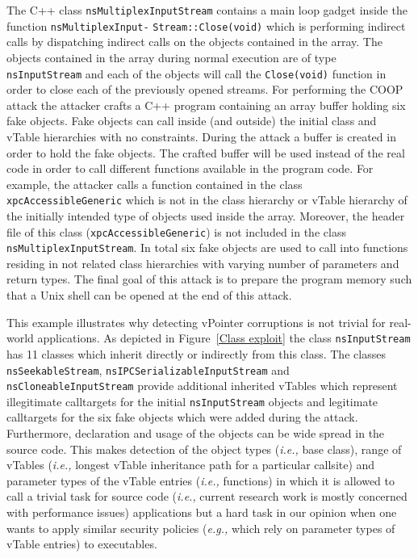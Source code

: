The C++ class \texttt{nsMultiplexInputStream} contains a main loop gadget inside the function 
\texttt{nsMultiplexInput-} \texttt{Stream::Close(void)} which is performing indirect calls by dispatching
indirect calls on the objects contained in the array. 
The objects contained in the array during normal execution are of type \texttt{nsInputStream} and each
of the objects will call the \texttt{Close(void)} function in order to close each of the previously opened streams.
For performing the COOP attack the attacker crafts a C++ program containing an array buffer holding 
six fake objects. Fake objects can call inside (and outside) the initial class and vTable hierarchies
with no constraints.
During the attack a buffer is created in order to hold the fake objects.
The crafted buffer will be used instead of the real code in order to call different functions
available in the program code. For example, the attacker calls a function contained in the class
\texttt{xpcAccessibleGeneric} which is not in the class hierarchy or vTable hierarchy
of the initially intended type of objects used inside the array.
Moreover, the header file of this class (\texttt{xpcAccessibleGeneric}) is not included in the 
class \texttt{nsMultiplexInputStream}.
In total six fake objects are used to call into functions residing in not related class hierarchies with varying 
number of parameters and return types. The final goal of this attack is to prepare the program memory such 
that a Unix shell can be opened at the end of this attack.

This example illustrates why detecting vPointer corruptions is not trivial for real-world applications.
As depicted in Figure~\ref{Class exploit} the class \texttt{nsInputStream} has 11 classes which inherit directly
or indirectly from this class. The classes \texttt{nsSeekableStream}, \texttt{nsIPCSerializableInputStream}
and \texttt{nsCloneableInputStream} provide additional inherited vTables which represent illegitimate calltargets
for the initial \texttt{nsInputStream} objects and legitimate calltargets for the six fake objects which were added during the attack.
Furthermore, declaration and usage of the objects can be wide spread in the source code. This makes
detection of the object types (\textit{i.e.,} base class), range of vTables (\textit{i.e.,} longest vTable inheritance path for a particular callsite)
and parameter types of the vTable entries (\textit{i.e.,} functions) in which it is allowed to call a 
trivial task for source code (\textit{i.e.,} current research work is mostly concerned with performance issues)
applications but a hard task in our opinion when one wants to apply similar security policies 
(\textit{e.g.,} which rely on parameter types of vTable entries) to executables.





